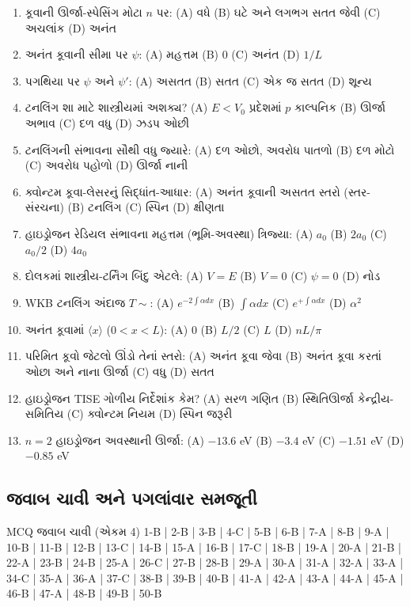 \begin{enumerate}[label=\textbf{\arabic*.}]
  \item કૂવાની ઊર્જા-સ્પેસિંગ મોટા $n$ પર: (A) વધે (B) ઘટે અને લગભગ સતત જેવી (C) અચલાંક (D) અનંત
  \item અનંત કૂવાની સીમા પર $\psi$: (A) મહત્તમ (B) 0 (C) અનંત (D) $1/L$
  \item પગથિયા પર $\psi$ અને $\psi'$: (A) અસતત (B) સતત (C) એક જ સતત (D) શૂન્ય
  \item ટનલિંગ શા માટે શાસ્ત્રીયમાં અશક્ય? (A) $E<V_0$ પ્રદેશમાં $p$ કાલ્પનિક (B) ઊર્જા અભાવ (C) દળ વધુ (D) ઝડપ ઓછી
  \item ટનલિંગની સંભાવના સૌથી વધુ જ્યારે: (A) દળ ઓછો, અવરોધ પાતળો (B) દળ મોટો (C) અવરોધ પહોળો (D) ઊર્જા નાની
  \item ક્વોન્ટમ કૂવા-લેસરનું સિદ્ધાંત-આધાર: (A) અનંત કૂવાની અસતત સ્તરો (સ્તર-સંરચના) (B) ટનલિંગ (C) સ્પિન (D) ક્ષીણતા
  \item હાઇડ્રોજન રેડિયલ સંભાવના મહત્તમ (ભૂમિ-અવસ્થા) ત્રિજ્યા: (A) $a_0$ (B) $2a_0$ (C) $a_0/2$ (D) $4a_0$
  \item દોલકમાં શાસ્ત્રીય-ટર્નિંગ બિંદુ એટલે: (A) $V=E$ (B) $V=0$ (C) $\psi=0$ (D) નોડ
  \item WKB ટનલિંગ અંદાજ $T\sim$: (A) $e^{-2\int\alpha dx}$ (B) $\int\alpha dx$ (C) $e^{+\int\alpha dx}$ (D) $\alpha^{2}$
  \item અનંત કૂવામાં $\langle x\rangle$ ($0<x<L$): (A) $0$ (B) $L/2$ (C) $L$ (D) $nL/\pi$
  \item પરિમિત કૂવો જેટલો ઊંડો તેનાં સ્તરો: (A) અનંત કૂવા જેવા (B) અનંત કૂવા કરતાં ઓછા અને નાના ઊર્જા (C) વધુ (D) સતત
  \item હાઇડ્રોજન TISE ગોળીય નિર્દેશાંક કેમ? (A) સરળ ગણિત (B) સ્થિતિઊર્જા કેન્દ્રીય-સમિતિય (C) ક્વોન્ટમ નિયમ (D) સ્પિન જરૂરી
  \item $n=2$ હાઇડ્રોજન અવસ્થાની ઊર્જા: (A) $-13.6$ eV (B) $-3.4$ eV (C) $-1.51$ eV (D) $-0.85$ eV
\end{enumerate}

\subsection*{જવાબ ચાવી અને પગલાંવાર સમજૂતી}
\begin{javabchavi}{MCQ જવાબ ચાવી (એકમ 4)}
1-B | 2-B | 3-B | 4-C | 5-B | 6-B | 7-A | 8-B | 9-A | 10-B |
11-B | 12-B | 13-C | 14-B | 15-A | 16-B | 17-C | 18-B | 19-A | 20-A |
21-B | 22-A | 23-B | 24-B | 25-A | 26-C | 27-B | 28-B | 29-A | 30-A |
31-A | 32-A | 33-A | 34-C | 35-A | 36-A | 37-C | 38-B | 39-B | 40-B |
41-A | 42-A | 43-A | 44-A | 45-A | 46-B | 47-A | 48-B | 49-B | 50-B
\end{javabchavi}

